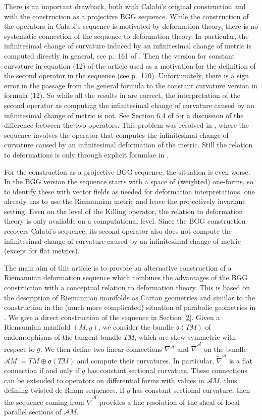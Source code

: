 \documentclass[12pt,a4paper]{amsart}
\def\frak{\mathfrak}
\def\Cal{\mathcal}
\numberwithin{theorem}{section}
\numberwithin{equation}{section}
\theoremstyle{definition}
\theoremstyle{remark}
\begin{document}
There is an important drawback, both with Calabi's original construction and with the
construction as a projective BGG sequence. While the construction of the operators in
Calabi's sequence is motivated by deformation theory, there is no systematic
connection of the sequence to deformation theory. In particular, the infinitesimal
change of curvature induced by an infinitesimal change of metric is computed directly
in general, see p.\ 161 of \cite{Calabi}. Then the version for constant curvature in
equation (12) of the article used as a motivation for the definition of the second
operator in the sequence (see p.\ 170). Unfortunately, there is a sign error in the
passage from the general formula to the constant curvature version in formula
(12). So while all the results in \cite{Calabi} are correct, the interpretation of
the second operator as computing the infinitesimal change of curvature caused by an
infinitesimal change of metric is not. See Section 6.4 of \cite{CELM} for a
discussion of the difference between the two operators.  This problem was resolved in
\cite{BBL}, where the sequence involves the operator that computes the infinitesimal
change of curvature caused by an infinitesimal deformation of the metric. Still the
relation to deformations is only through explicit formulae in \cite{BBL}.

For the construction as a projective BGG sequence, the situation is even worse. In
the BGG version the sequence starts with a space of (weighted) one-forms, so to
identify these with vector fields as needed for deformation interpretations, one
already has to use the Riemannian metric and leave the projectively invariant
setting.  Even on the level of the Killing operator, the relation to deformation
theory is only available on a computational level. Since the BGG construction
recovers Calabi's sequence, its second operator also does not compute the
infinitesimal change of curvature caused by an infinitesimal change of metric (except
for flat metrics).

The main aim of this article is to provide an alternative construction of a
Riemannian deformation sequence which combines the advantages of the BGG construction
with a conceptual relation to deformation theory. This is based on the description of
Riemannian manifolds as Cartan geometries and similar to the construction in the
(much more complicated) situation of parabolic geometries in \cite{deformations}. We
give a direct construction of the sequence in Section \ref{2}. Given a Riemannian
manifold $(M,g)$, we consider the bundle $\frak o(TM)$ of endomorphisms of the
tangent bundle $TM$, which are skew symmetric with respect to $g$. We then define two
linear connections $\nabla^{\Cal A}$ and $\tilde\nabla^{\Cal A}$ on the bundle $\Cal
AM:=TM\oplus\frak o(TM)$ and compute their curvatures. In particular,
$\tilde\nabla^{\Cal A}$ is a flat connection if and only if $g$ has constant
sectional curvature. These connections can be extended to operators on differential
forms with values in $\Cal AM$, thus defining twisted de Rham sequences. If $g$ has
constant sectional curvature, then the sequence coming from $\tilde\nabla^{\Cal A}$
provides a fine resolution of the sheaf of local parallel sections of $\Cal AM$.
\end{document}
